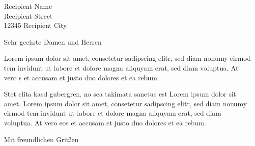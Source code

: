 
\begin{letter}{
    Recipient Name\\
    Recipient Street\\
    12345 Recipient City
  }

\opening{Sehr geehrte Damen und Herren}

Lorem ipsum dolor sit amet, consetetur sadipscing elitr, sed diam nonumy eirmod
tem invidunt ut labore et dolore magna aliquyam erat, sed diam voluptua. At vero
s et accusam et justo duo dolores et ea rebum. 

Stet clita kasd gubergren, no sea takimata sanctus est Lorem ipsum dolor sit
amet. Lorem ipsum dolor sit amet, consetetur sadipscing elitr, sed diam nonumy
eirmod tem invidunt ut labore et dolore magna aliquyam erat, sed diam voluptua.
At vero eos et accusam et justo duo dolores et ea rebum. 

\closing{Mit freundlichen Grüßen}

\end{letter}

